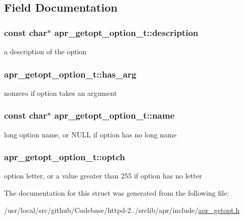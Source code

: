 \subsection{Field Documentation}
\subsubsection[{\texorpdfstring{description}{description}}]{\setlength{\rightskip}{0pt plus 5cm}const char$\ast$ apr\+\_\+getopt\+\_\+option\+\_\+t\+::description}\hypertarget{structapr__getopt__option__t_a8fd515c0a9e621f6c0d058772429ab98}{}\label{structapr__getopt__option__t_a8fd515c0a9e621f6c0d058772429ab98}
a description of the option 
\subsubsection[{\texorpdfstring{has\+\_\+arg}{has_arg}}]{ apr\+\_\+getopt\+\_\+option\+\_\+t\+::has\+\_\+arg}\hypertarget{structapr__getopt__option__t_aac65dae93f6d35f4848b91f6f9d66278}{}\label{structapr__getopt__option__t_aac65dae93f6d35f4848b91f6f9d66278}
nonzero if option takes an argument 
\subsubsection[{\texorpdfstring{name}{name}}]{\setlength{\rightskip}{0pt plus 5cm}const char$\ast$ apr\+\_\+getopt\+\_\+option\+\_\+t\+::name}\hypertarget{structapr__getopt__option__t_a7e623913c9761495c5d37adf6ff1ee69}{}\label{structapr__getopt__option__t_a7e623913c9761495c5d37adf6ff1ee69}
long option name, or N\+U\+LL if option has no long name 
\subsubsection[{\texorpdfstring{optch}{optch}}]{ apr\+\_\+getopt\+\_\+option\+\_\+t\+::optch}\hypertarget{structapr__getopt__option__t_a476e67c4dde620fe5b4f5952238c6e94}{}\label{structapr__getopt__option__t_a476e67c4dde620fe5b4f5952238c6e94}
option letter, or a value greater than 255 if option has no letter 

The documentation for this struct was generated from the following file\+:\begin{DoxyCompactItemize}
\item 
/usr/local/src/github/\+Codebase/httpd-\/2../srclib/apr/include/\hyperlink{apr__getopt_8h}{apr\+\_\+getopt.\+h}\end{DoxyCompactItemize}
